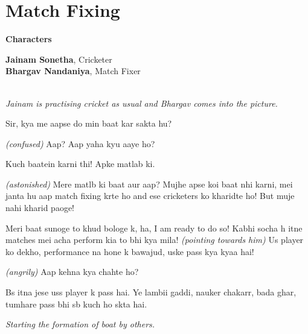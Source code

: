 \documentclass[12pt,a4paper,oneside]{memoir}
\begin{document}
\chapter*{Match Fixing}

\begin{center}

\textbf{Characters}

\vskip 1cm

\textbf{Jainam Sonetha}, Cricketer \\
\textbf{Bhargav Nandaniya}, Match Fixer \\
\vskip 1cm
\end{center}

\begin{description}[itemsep=1ex,leftmargin=1cm]
\setlength{\parskip}{5pt}

\item[] \hfill \\

\textit{Jainam is practising cricket as usual and Bhargav comes into the picture.}

\item[BHARGAV] Sir, kya me aapse do min baat kar sakta hu?

\item[JAINAM] \textit{(confused)} Aap? Aap yaha kyu aaye ho?

\item[BHARGAV] Kuch baatein karni thi! Apke matlab ki.

\item[JAINAM] \textit{(astonished)} Mere matlb ki baat aur aap? Mujhe apse koi baat nhi karni, mei janta hu aap match fixing krte ho and ese cricketers ko kharidte ho! But muje nahi kharid paoge!

\item[BHARGAV] Meri baat sunoge to khud bologe k, ha, I am ready to do so! Kabhi socha h itne matches mei acha perform kia to bhi kya mila! \textit{(pointing towards him)} Us player ko dekho, performance na hone k bawajud, uske pass kya kyaa hai!

\item[JAIMIN] \textit{(angrily)} Aap kehna kya chahte ho?

\item[BHARGAV] Bs itna jese uss player k pass hai. Ye lambii gaddi, nauker chakarr, bada ghar, tumhare pass bhi sb kuch ho skta hai.

\textit{Starting the formation of boat by others.}


\end{description}
\end{document}
